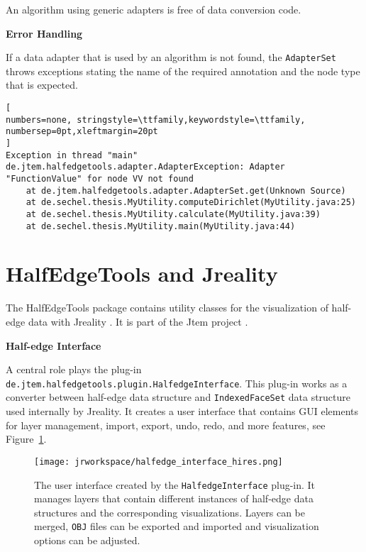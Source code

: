 \documentclass[Thesis.tex]{subfiles}
\begin{document}
An algorithm using generic adapters is free of data conversion code.


{\bf Error Handling}

If a data adapter that is used by an algorithm is not found, the {\tt AdapterSet} throws exceptions stating
the name of the required annotation and the node type that is expected. 

\begin{lstlisting}[
numbers=none, stringstyle=\ttfamily,keywordstyle=\ttfamily, numbersep=0pt,xleftmargin=20pt
]
Exception in thread "main" de.jtem.halfedgetools.adapter.AdapterException: Adapter "FunctionValue" for node VV not found
	at de.jtem.halfedgetools.adapter.AdapterSet.get(Unknown Source)
	at de.sechel.thesis.MyUtility.computeDirichlet(MyUtility.java:25)
	at de.sechel.thesis.MyUtility.calculate(MyUtility.java:39)
	at de.sechel.thesis.MyUtility.main(MyUtility.java:44)
\end{lstlisting}


\section{{\sc HalfEdgeTools} and {\sc Jreality}}
\label{sec:halfedge_tools_visualization}

The {\sc HalfEdgeTools} package contains utility classes for the visualization of half-edge data with 
{\sc Jreality} \cite{JrealityWebsite}. It is part of the {\sc Jtem} project \cite{JtemWebsite}. 

{\bf Half-edge Interface}

A central role plays the plug-in {\tt de.jtem.halfedge\-tools.plugin.Halfedge\-Interface}. This plug-in works 
as a converter between half-edge data structure and {\tt IndexedFaceSet} data structure used internally 
by {\sc Jreality}. It creates a user interface that contains GUI elements for layer management, import, export,
undo, redo, and more features, see Figure~\ref{fig:halfedge_interface}.

\begin{figure}
	\centering
	\texttt{[image: jrworkspace/halfedge\_interface\_hires.png]}
	\caption{The user interface created by the {\tt HalfedgeInterface} plug-in. It manages layers that
		contain different instances of half-edge data structures and the corresponding visualizations.
		Layers can be merged, {\tt OBJ} files can be exported and imported and visualization
		options can be adjusted. 
	}
	\label{fig:halfedge_interface}
\end{figure}
\end{document}
